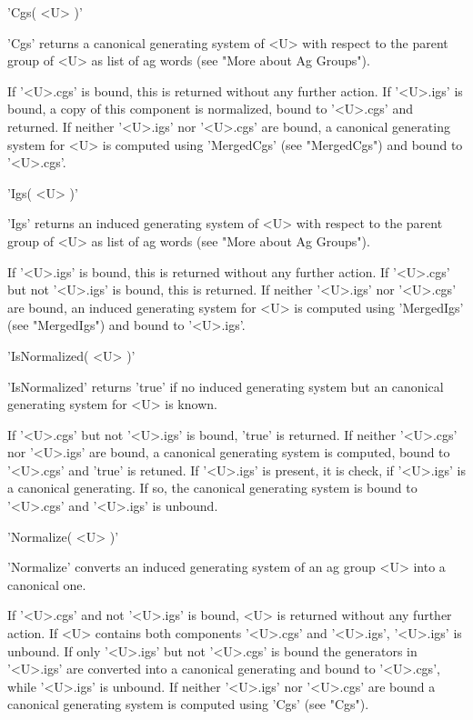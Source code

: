 
'Cgs( <U> )'

'Cgs' returns a  canonical generating system  of <U> with respect to  the
parent group of <U> as list of ag words (see "More about Ag Groups").

If '<U>.cgs' is  bound, this is returned without  any further action.  If
'<U>.igs' is  bound, a copy  of   this component is normalized,  bound to
'<U>.cgs' and returned.  If neither  '<U>.igs' nor '<U>.cgs' are bound, a
canonical generating system for  <U>  is computed using 'MergedCgs'  (see
"MergedCgs") and bound to '<U>.cgs'.


'Igs( <U> )'

'Igs'  returns an induced generating system  of <U> with  respect to  the
parent group of <U> as list of ag words (see "More about Ag Groups").

If '<U>.igs' is bound,  this is returned without  any further action.  If
'<U>.cgs' but  not  '<U>.igs'  is bound,  this is returned.   If  neither
'<U>.igs' nor '<U>.cgs'  are bound, an induced generating  system for <U>
is computed using 'MergedIgs' (see "MergedIgs") and bound to '<U>.igs'.


'IsNormalized( <U> )'

'IsNormalized' returns 'true'  if no   induced  generating system but  an
canonical generating system for <U> is known.

If '<U>.cgs' but not '<U>.igs' is bound, 'true'  is returned.  If neither
'<U>.cgs' nor '<U>.igs'   are  bound,  a  canonical generating system  is
computed,  bound to '<U>.cgs'  and 'true' is   retuned.  If  '<U>.igs' is
present, it is check, if '<U>.igs' is a canonical generating.  If so, the
canonical  generating system  is  bound  to  '<U>.cgs'   and '<U>.igs' is
unbound.


'Normalize( <U> )'

'Normalize' converts an induced generating system of an ag group <U> into
a canonical one.

If  '<U>.cgs'  and not  '<U>.igs' is bound,  <U> is  returned without any
further action.  If <U> contains both components '<U>.cgs' and '<U>.igs',
'<U>.igs' is unbound.  If  only '<U>.igs' but not '<U>.cgs'  is bound the
generators in  '<U>.igs'  are converted into   a canonical generating and
bound to '<U>.cgs', while '<U>.igs' is unbound.  If neither '<U>.igs' nor
'<U>.cgs' are bound a canonical generating system is computed using 'Cgs'
(see "Cgs").

